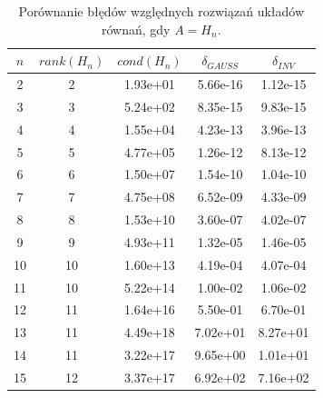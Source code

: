 \documentclass{article}
\begin{document}
\begin{table}[h!]
    \centering
    \begin{tabular}{ |c|c|c|c|c| } 
        \hline 
        $n$ & $rank(H_n)$ & $cond(H_n)$ & $\delta_{GAUSS}$ & $\delta_{INV}$ \\
        \hline
        2 & 2 & 1.93e+01 & 5.66e-16 & 1.12e-15 \\ 
        \hline
        3 & 3 & 5.24e+02 & 8.35e-15 & 9.83e-15 \\ 
        \hline
        4 & 4 & 1.55e+04 & 4.23e-13 & 3.96e-13 \\ 
        \hline
        5 & 5 & 4.77e+05 & 1.26e-12 & 8.13e-12 \\ 
        \hline
        6 & 6 & 1.50e+07 & 1.54e-10 & 1.04e-10 \\ 
        \hline
        7 & 7 & 4.75e+08 & 6.52e-09 & 4.33e-09 \\ 
        \hline
        8 & 8 & 1.53e+10 & 3.60e-07 & 4.02e-07 \\ 
        \hline
        9 & 9 & 4.93e+11 & 1.32e-05 & 1.46e-05 \\ 
        \hline
        10 & 10 & 1.60e+13 & 4.19e-04 & 4.07e-04 \\ 
        \hline
        11 & 10 & 5.22e+14 & 1.00e-02 & 1.06e-02 \\ 
        \hline
        12 & 11 & 1.64e+16 & 5.50e-01 & 6.70e-01 \\ 
        \hline
        13 & 11 & 4.49e+18 & 7.02e+01 & 8.27e+01 \\ 
        \hline
        14 & 11 & 3.22e+17 & 9.65e+00 & 1.01e+01 \\ 
        \hline
        15 & 12 & 3.37e+17 & 6.92e+02 & 7.16e+02 \\ 
        \hline
    \end{tabular}
    \caption{Porównanie błędów względnych rozwiązań układów równań, gdy $A = H_n$.}
\end{table}
\end{document}
